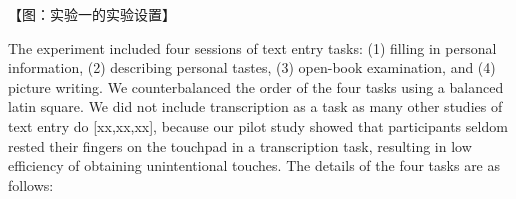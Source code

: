 【图：实验一的实验设置】


The experiment included four sessions of text entry tasks: (1) filling in personal information, (2) describing personal tastes, (3) open-book examination, and (4) picture writing. We counterbalanced the order of the four tasks using a balanced latin square. We did not include transcription as a task as many other studies of text entry do [xx,xx,xx], because our pilot study showed that participants seldom rested their fingers on the touchpad in a transcription task, resulting in low efficiency of obtaining unintentional touches. The details of the four tasks are as follows:


